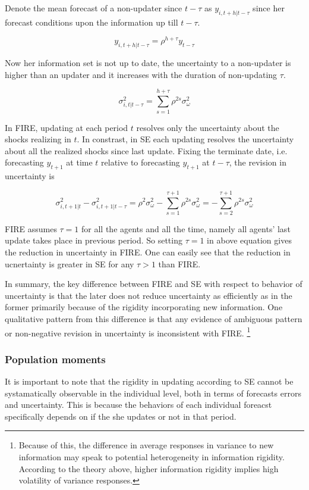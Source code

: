 \documentclass[]{article}
\begin{document}
Denote the mean forecast of a non-updater since $t-\tau$ as $y_{i,t+h|t-\tau}$ since her forecast conditions upon the information up till $t-\tau$.

$$y_{i,t+h|t-\tau} = \rho^{h+\tau} y_{t-\tau}$$

Now her information set is not up to date, the uncertainty to a non-updater is higher than an updater and it increases with the duration of non-updating $\tau$. 

$$\sigma^2_{i,t|t-\tau}= \sum^{h+\tau}_{s=1}\rho^{2s} \sigma^2_{\omega}$$
 
In FIRE, updating at each period $t$ resolves only the uncertainty about the shocks realizing in $t$. In constrast, in SE each updating resolves the uncertainty about all the realized shocks since last update. Fixing the terminate date, i.e. forecasting  $y_{t+1}$ at time $t$ relative to forecasting $y_{t+1}$ at $t-\tau$, the revision in uncertainty is 

$$\sigma^2_{i,t+1|t} - \sigma^2_{i,t+1|t-\tau} = \rho^{2} \sigma^2_{\omega} - \sum^{\tau+1}_{s=1}\rho^{2s} \sigma^2_{\omega} = -\sum^{\tau+1}_{s=2} \rho^{2s}\sigma^2_{\omega}$$

FIRE assumes  $\tau=1$ for all the agents and all the time, namely all agents' last update takes place in previous period. So setting $\tau =1$ in above equation gives the reduction in uncertainty in FIRE. One can easily see that the reduction in ucnertainty is greater in SE for any $\tau>1$ than FIRE.

In summary, the key difference between FIRE and SE with respect to behavior of uncertainty is that the later does not reduce uncertainty  as efficiently as in the former primarily because of the rigidity incorporating new information.  One qualitative pattern from this difference is that any evidence of ambiguous pattern  or non-negative revision in uncertainty is inconsistent with FIRE. \footnote{Because of this, the difference in average responses in variance to new information may speak to potential heterogeneity in information rigidity. According to the theory above, higher information rigidity implies high volatility of variance responses.  }
 


\subsubsection{Population moments} 
	
It is important to note that the rigidity in updating according to SE cannot be systamatically observable in the individual level, both in terms of forecasts errors and uncertainty. This is because the behaviors of each individual foreacst specifically depends on if the she updates or not in that period. 
\end{document}
